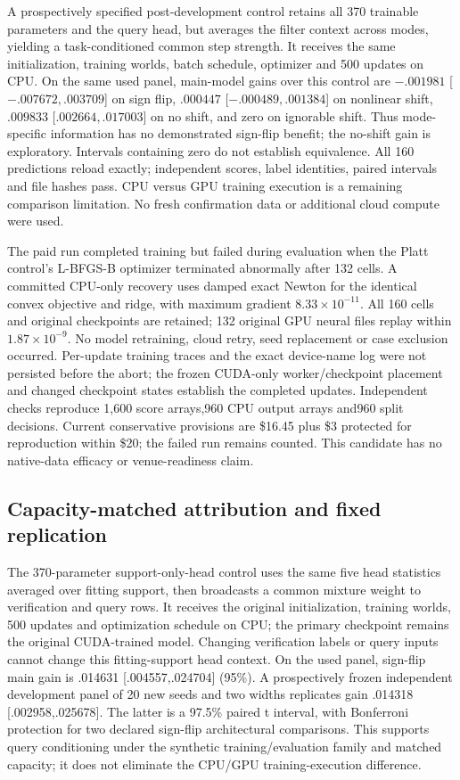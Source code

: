 \documentclass[10pt]{article}
\begin{document}
A prospectively specified post-development control retains all 370 trainable parameters and the query head, but averages the filter context across modes, yielding a task-conditioned common step strength. It receives the same initialization, training worlds, batch schedule, optimizer and 500 updates on CPU. On the same used panel, main-model gains over this control are $-.001981$ [$-.007672,.003709$] on sign flip, $.000447$ [$-.000489,.001384$] on nonlinear shift, $.009833$ [$.002664,.017003$] on no shift, and zero on ignorable shift. Thus mode-specific information has no demonstrated sign-flip benefit; the no-shift gain is exploratory. Intervals containing zero do not establish equivalence. All 160 predictions reload exactly; independent scores, label identities, paired intervals and file hashes pass. CPU versus GPU training execution is a remaining comparison limitation. No fresh confirmation data or additional cloud compute were used.

The paid run completed training but failed during evaluation when the Platt control's L-BFGS-B optimizer terminated abnormally after 132 cells. A committed CPU-only recovery uses damped exact Newton for the identical convex objective and ridge, with maximum gradient $8.33\times10^{-11}$. All 160 cells and original checkpoints are retained; 132 original GPU neural files replay within $1.87\times10^{-9}$. No model retraining, cloud retry, seed replacement or case exclusion occurred. Per-update training traces and the exact device-name log were not persisted before the abort; the frozen CUDA-only worker/checkpoint placement and changed checkpoint states establish the completed updates. Independent checks reproduce 1,600 score arrays,960 CPU output arrays and960 split decisions. Current conservative provisions are \$16.45 plus \$3 protected for reproduction within \$20; the failed run remains counted. This candidate has no native-data efficacy or venue-readiness claim.

\subsection{Capacity-matched attribution and fixed replication}
The 370-parameter support-only-head control uses the same five head statistics averaged over fitting support, then broadcasts a common mixture weight to verification and query rows. It receives the original initialization, training worlds, 500 updates and optimization schedule on CPU; the primary checkpoint remains the original CUDA-trained model. Changing verification labels or query inputs cannot change this fitting-support head context. On the used panel, sign-flip main gain is .014631 [.004557,.024704] (95\%). A prospectively frozen independent development panel of 20 new seeds and two widths replicates gain .014318 [.002958,.025678]. The latter is a 97.5\% paired t interval, with Bonferroni protection for two declared sign-flip architectural comparisons. This supports query conditioning under the synthetic training/evaluation family and matched capacity; it does not eliminate the CPU/GPU training-execution difference.
\end{document}
